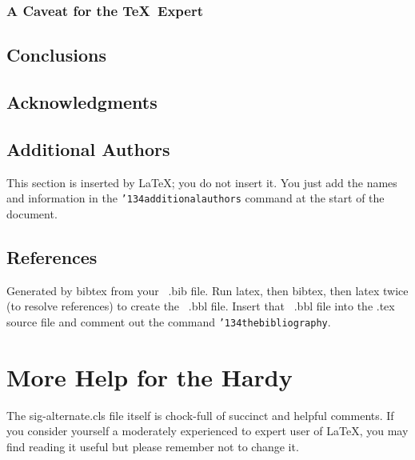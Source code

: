 \documentclass{sig-alternate-05-2015}
\begin{document}
\subsubsection*{A Caveat for the \TeX\ Expert}
\subsection{Conclusions}
\subsection{Acknowledgments}
\subsection{Additional Authors}
This section is inserted by \LaTeX; you do not insert it.
You just add the names and information in the
\texttt{{\char'134}additionalauthors} command at the start
of the document.
\subsection{References}
Generated by bibtex from your ~.bib file.  Run latex,
then bibtex, then latex twice (to resolve references)
to create the ~.bbl file.  Insert that ~.bbl file into
the .tex source file and comment out
the command \texttt{{\char'134}thebibliography}.
\section{More Help for the Hardy}
The sig-alternate.cls file itself is chock-full of succinct
and helpful comments.  If you consider yourself a moderately
experienced to expert user of \LaTeX, you may find reading
it useful but please remember not to change it.
\end{document}
